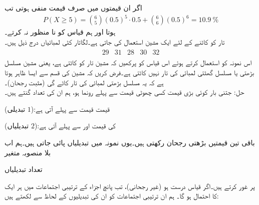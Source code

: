 اگر ان  قیمتوں میں صرف  قیمت منفی ہوتی تب
\begin{align*}
P(X\ge 5)=\binom{6}{5}(0.5)^5\cdot 0.5+\binom{6}{6}(0.5)^6=\SI{10.9}{\percent}
\end{align*}
ہوتا اور ہم قیاس کو نا منظور نہ کرتے۔
\quad {}\\
تار کو کاٹنے کے لئے ایک مشین استعمال کی جاتی ہے۔لگاتار کٹی لمبائیاں درج ذیل ہیں۔
\begin{align*}
\begin{array}{ccccc}
29&31&28&30&32
\end{array}
\end{align*} 
اس نمونہ کو استعمال کرتے ہوئے اس قیاس کو پرکھیں کہ مشین تار کو  کاٹتی ہے، یعنی مشین مسلسل بڑھتی یا مسلسل گھٹتی لمبائی کی تار نہیں کاٹتی ہے۔فرض کریں کہ مشین کی قسم سے ایسا ظاہر ہوتا ہے کہ یہ مسلسل بڑھتی لمبائی کی تار کاٹے گی (مثبت رجحان)۔\\
حل:\quad
جتنی بار کوئی بڑی قیمت کسی چھوٹی قیمت سے پہلے رونما ہو، ہم ان  کی تعداد گنتے ہیں۔\\
\centerline{
 قیمت  قیمت سے پہلے آتی ہے:\quad  ($1$ تبدیلی)
}
\centerline{
 کی قیمت  اور  سے پہلے آتی ہے:\quad  ($2$ تبدیلیاں)
}
باقی تین قیمتیں بڑھتی رجحان رکھتی ہیں۔یوں نمونہ میں  تبدیلیاں پائی جاتی ہیں۔ہم اب بلا منصوبہ متغیر\\
\centerline{
تعداد تبدیلیاں
}
پر غور کرتے ہیں۔اگر قیاس درست ہو (غیر رجحانی)، تب پانچ اجزاء  کے  ترتیبی اجتماعات میں ہر ایک کا احتمال
  ہو گا۔ ہم ان ترتیبی اجتماعات کو ان کی تبدیلیوں کے لحاظ سے لکھتے ہیں: 
